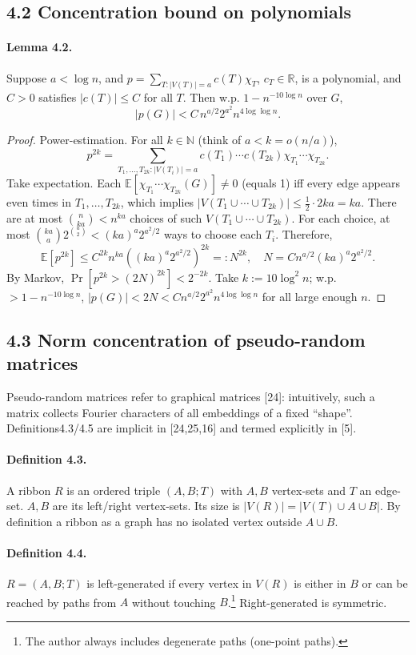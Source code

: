 \documentclass[10pt,a4paper]{article}
\begin{document}
\subsection*{4.2 Concentration bound on polynomials}
\paragraph{Lemma 4.2.} Suppose $a<\log n$, and $p=\sum_{T:|V(T)|=a}c(T)\chi_T$, $c_T\in\mathbb R$, is a polynomial, and $C>0$ satisfies $|c(T)|\le C$ for all $T$. Then w.p. $1-n^{-10\log n}$ over $G$,
\[|p(G)|<C\,n^{a/2}2^{a^2}n^{4\log\log n}.\tag{4.4}\]
\begin{proof}Power-estimation. For all $k\in\mathbb N$ (think of $a<k=o(n/a)$),
\[p^{2k}=\sum_{T_1,\ldots,T_{2k}:|V(T_i)|=a}c(T_1)\cdots c(T_{2k})\chi_{T_1}\cdots\chi_{T_{2k}}.\tag{4.5}\]
Take expectation. Each $\mathbb E[\chi_{T_1}\cdots\chi_{T_{2k}}(G)]\ne0$ (equals 1) iff every edge appears even times in $T_1,\ldots,T_{2k}$, which implies $|V(T_1\cup\cdots\cup T_{2k})|\le\frac12\cdot2ka=ka$. There are at most $\binom n{ka}<n^{ka}$ choices of such $V(T_1\cup\cdots\cup T_{2k})$. For each choice, at most $\binom{ka}a2^{\binom a2}<(ka)^a2^{a^2/2}$ ways to choose each $T_i$. Therefore,
\[\mathbb E[p^{2k}]\le C^{2k}n^{ka}((ka)^a2^{a^2/2})^{2k}=:N^{2k},\quad N=Cn^{a/2}(ka)^a2^{a^2/2}.\]
By Markov, $\Pr[p^{2k}>(2N)^{2k}]<2^{-2k}$. Take $k:=10\log^2n$; w.p. $>1-n^{-10\log n}$, $|p(G)|<2N<Cn^{a/2}2^{a^2}n^{4\log\log n}$ for all large enough $n$.\end{proof}
\subsection*{4.3 Norm concentration of pseudo-random matrices}
Pseudo-random matrices refer to graphical matrices [24]: intuitively, such a matrix collects Fourier characters of all embeddings of a fixed ``shape''. Definitions4.3/4.5 are implicit in [24,25,16] and termed explicitly in [5].
\paragraph{Definition 4.3.} A ribbon $R$ is an ordered triple $(A,B;T)$ with $A,B$ vertex-sets and $T$ an edge-set. $A,B$ are its left/right vertex-sets. Its size is $|V(R)|=|V(T)\cup A\cup B|$. By definition a ribbon as a graph has no isolated vertex outside $A\cup B$.
\paragraph{Definition 4.4.} $R=(A,B;T)$ is left-generated if every vertex in $V(R)$ is either in $B$ or can be reached by paths from $A$ without touching $B$.\footnote{The author always includes degenerate paths (one-point paths).} Right-generated is symmetric.
\end{document}
